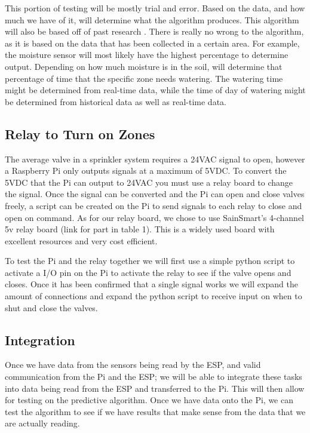 \documentclass[letterpaper, 10 pt, conference]{ieeeconf}  %
\begin{document}
This portion of testing will be mostly trial and error. Based on the data, and how much we have of it, will determine what the algorithm produces. This algorithm will also be based off of past research \cite{SmartSprinkler}. There is really no wrong to the algorithm, as it is based on the data that has been collected in a certain area. For example, the moisture sensor will most likely have the highest percentage to determine output. Depending on how much moisture is in the soil, will determine that percentage of time that the specific zone needs watering. The watering time might be determined from real-time data, while the time of day of watering might be determined from historical data as well as real-time data. 

\subsection{Relay to Turn on Zones}
 The average valve in a sprinkler system requires a 24VAC signal to open, however a Raspberry Pi only outputs signals at a maximum of 5VDC. To convert the 5VDC that the Pi can output to 24VAC you must use a relay board to change the signal. Once the signal can be converted and the Pi can open and close valves freely, a script can be created on the Pi to send signals to each relay to close and open on command.
As for our relay board, we chose to use SainSmart's \cite{relayBoard} 4-channel 5v relay board (link for part in table 1). This is a widely used board with excellent resources and very cost efficient.

To test the Pi and the relay together we will first use a simple python script to activate a I/O pin on the Pi to activate the relay to see if the valve opens and closes. Once it has been confirmed that a single signal works we will expand the amount of connections and expand the python script to receive input on when to shut and close the valves.

\subsection{Integration}
Once we have data from the sensors being read by the ESP, and valid communication from the Pi and the ESP; we will be able to integrate these tasks into data being read from the ESP and transferred to the Pi. This will then allow for testing on the predictive algorithm. Once we have data onto the Pi, we can test the algorithm to see if we have results that make sense from the data that we are actually reading. 
\end{document}
